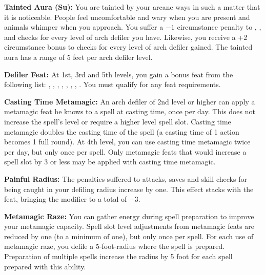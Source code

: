 \textbf{Tainted Aura (Su):} You are tainted by your arcane ways in such a matter that it is noticeable. People feel uncomfortable and wary when you are present and animals whimper when you approach. You suffer a $-1$ circumstance penalty to , ,  and  checks for every level of arch defiler you have. Likewise, you receive a +2 circumstance bonus to  checks for every level of arch defiler gained. The tainted aura has a range of 5 feet
per arch defiler level.

\textbf{Defiler Feat:} At 1st, 3rd and 5th levels, you gain a bonus feat from the following list: , , , , , , , . You must qualify for any feat requirements.

\textbf{Casting Time Metamagic:} An arch defiler of 2nd level or higher can apply a metamagic feat he knows to a spell at casting time, once per day. This does not increase the spell's level or require a higher level spell slot. Casting time metamagic doubles the casting time of the spell (a casting time of 1 action becomes 1 full round). At 4th level, you can use casting time metamagic twice per day, but only once per spell. Only metamagic feats that would increase a spell slot by 3 or less may be applied with casting time metamagic.

\textbf{Painful Radius:} The penalties suffered to attacks, saves and skill checks for being caught in your defiling radius increase by one. This effect stacks with the  feat, bringing the modifier to a total of $-3$.

\textbf{Metamagic Raze:} You can gather energy during spell preparation to improve your metamagic capacity. Spell slot level adjustments from metamagic feats are reduced by one (to a minimum of one), but only once per spell. For each use of metamagic raze, you defile a 5-foot-radius where the spell is prepared. Preparation of multiple spells increase the radius by 5 foot for each spell prepared with this ability.


